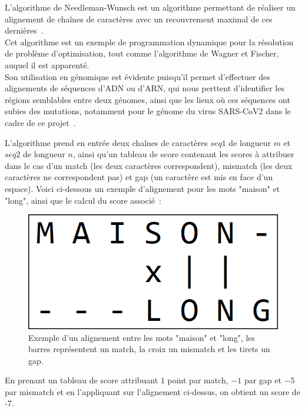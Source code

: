 \documentclass[12pt]{article}
\begin{document}
L'algorithme de Needleman-Wunsch est un algorithme permettant de réaliser un alignement de chaînes de caractères avec un recouvrement maximal de ces dernières~\cite{nwcours}. \\
Cet algorithme est un exemple de programmation dynamique pour la résolution de problème d'optimisation, tout comme l'algorithme de Wagner et Fischer, auquel il est apparenté.\\
Son utilisation en génomique est évidente puisqu'il permet d'effectuer des alignements de séquences d'ADN ou d'ARN, qui nous perttent d'identifier les régions semblables entre deux génomes, ainsi que les lieux où ces séquences ont subies des mutations, notamment pour le génome du virus SARS-CoV2 dans le cadre de ce projet~\cite{alignement}.

L'algorithme prend en entrée deux chaînes de caractères $seq1$ de longueur $m$ et $seq2$ de longueur $n$, ainsi qu'un tableau de score contenant les scores à attribuer dans le cas d'un match (les deux caractères correspondent), mismatch (les deux caractères ne correspondent pas) et gap (un caractère est mis en face d'un espace). Voici ci-dessous un exemple d'alignement pour les mots "maison" et "long", ainsi que le calcul du score associé~:\\

\begin{figure}[!h]
    \centering
    \includegraphics[scale = 0.55]{Images/Needleman/exemple alignement.png}
    \caption{Exemple d'un alignement entre les mots "maison" et "long", les barres représentent un match, la croix un mismatch et les tirets un gap.}
    \label{fig:Exemple d'un alignement entre les mots "maison" et "long", les barres représentent un match, la croix un mismatch et les tirets un gap.}
\end{figure}

En prenant un tableau de score attribuant $1$ point par match, $-1$ par gap et $-5$ par mismatch et en l'appliquant sur l'alignement ci-dessus, on obtient un score de -7.\\
\end{document}
